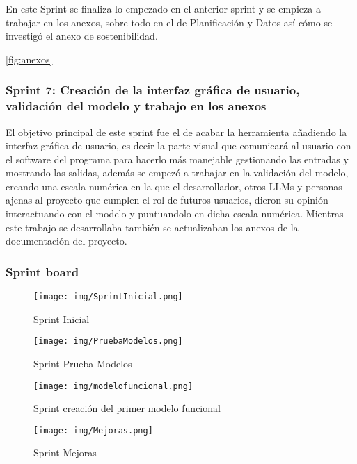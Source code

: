En este Sprint se finaliza lo empezado en el anterior sprint y se empieza a trabajar en los anexos, sobre todo en el de Planificación y Datos así cómo se investigó el anexo de sostenibilidad.

\ref{fig:anexos}

\subsubsection{Sprint 7: Creación de la interfaz gráfica de usuario, validación del modelo y trabajo en los anexos}

El objetivo principal de este sprint fue el de acabar la herramienta añadiendo la interfaz gráfica de usuario, es decir la parte visual que comunicará al usuario con el software del programa para hacerlo más manejable gestionando las entradas y mostrando las salidas, además se empezó a trabajar en la validación del modelo, creando una escala numérica en la que el desarrollador, otros LLMs y personas ajenas al proyecto que cumplen el rol de futuros usuarios, dieron su opinión interactuando con el modelo y puntuandolo en dicha escala numérica. Mientras este trabajo se desarrollaba también se actualizaban los anexos de la documentación del proyecto.

\subsubsection{Sprint board}

\begin{figure}[h!]
    \centering
    \texttt{[image: img/SprintInicial.png]}
    \caption{Sprint Inicial}
    \label{fig:sprintinicial}
\end{figure}

\begin{figure}[h!]
    \centering
    \texttt{[image: img/PruebaModelos.png]}
    \caption{Sprint Prueba Modelos}
    \label{fig:pruebamodelos}
\end{figure}

\begin{figure}[h!]
    \centering
    \texttt{[image: img/modelofuncional.png]}
    \caption{Sprint creación del primer modelo funcional}
    \label{fig:modelofuncional}
\end{figure}

\begin{figure}[h!]
    \centering
    \texttt{[image: img/Mejoras.png]}
    \caption{Sprint Mejoras}
    \label{fig:mejoras}
\end{figure}

